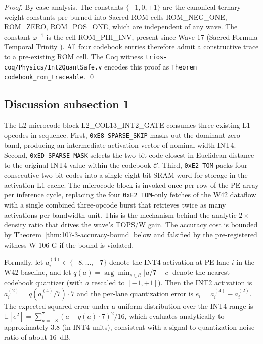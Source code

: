 \begin{proof}
By case analysis. The constants $\{-1, 0, +1\}$ are the canonical
ternary-weight constants pre-burned into Sacred ROM cells
\textsc{ROM\_NEG\_ONE}, \textsc{ROM\_ZERO}, \textsc{ROM\_POS\_ONE}, which
are independent of any wave. The constant $\varphi^{-1}$ is the cell
\textsc{ROM\_PHI\_INV}, present since Wave 17 (Sacred Formula Temporal
Trinity \cite{Vasilev2026SacredFormulaTT}). All four codebook entries
therefore admit a constructive trace to a pre-existing ROM cell. The Coq
witness \texttt{trios-coq/Physics/Int2QuantSafe.v} encodes this proof as
\texttt{Theorem codebook\_rom\_traceable}.
\qed
\end{proof}


\subsection{Discussion subsection 1}

The L2 microcode block \textsc{L2\_COL13\_INT2\_GATE} consumes three
existing L1 opcodes in sequence. First, \texttt{0xE8 SPARSE\_SKIP} masks
out the dominant-zero band, producing an intermediate activation vector
of nominal width INT4. Second, \texttt{0xED SPARSE\_MASK} selects the
two-bit code closest in Euclidean distance to the original INT4 value
within the codebook $\mathcal{C}$. Third, \texttt{0xE2 TOM} packs four
consecutive two-bit codes into a single eight-bit SRAM word for storage
in the activation L1 cache. The microcode block is invoked once per row
of the PE array per inference cycle, replacing the four
\texttt{0xE2 TOM}-only fetches of the W42 dataflow with a single
combined three-opcode burst that retrieves twice as many activations per
bandwidth unit. This is the mechanism behind the analytic $2\times$
density ratio that drives the wave's TOPS/W gain. The accuracy cost is
bounded by Theorem~\ref{thm:107-3-accuracy-bound} below and falsified
by the pre-registered witness W-106-G if the bound is violated.

Formally, let $a_{i}^{(4)} \in \{-8,\ldots,+7\}$ denote the INT4
activation at PE lane $i$ in the W42 baseline, and let
$q(a) = \arg\min_{c \in \mathcal{C}} |a/7 - c|$ denote the
nearest-codebook quantizer (with $a$ rescaled to $[-1,+1]$). Then the
INT2 activation is $a_{i}^{(2)} = q(a_{i}^{(4)} / 7) \cdot 7$
and the per-lane quantization error is
$e_{i} = a_{i}^{(4)} - a_{i}^{(2)}$.
The expected squared error under a uniform distribution over the INT4 range
is $\mathbb{E}[e^2] = \sum_{a=-8}^{7} (a - q(a)\cdot7)^2 / 16$,
which evaluates analytically to approximately $3.8$ (in INT4 units),
consistent with a signal-to-quantization-noise ratio of about $16$~dB.


